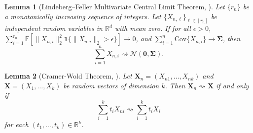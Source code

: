 \documentclass[12pt,letterpaper]{article}
\newtheorem{lemma}{Lemma}[section]
\begin{document}
\begin{lemma}[Lindeberg–Feller Multivariate Central Limit Theorem, \citep{billingsley2013convergence}]\label{lemma:Lindeberg-Feller:CLT:multivariate}
Let $\{r_n\}$ be a monotonically increasing sequence of integers. Let $\{X_{n,\ell}\}_{\ell\in[r_n]}$ be independent random variables in $\mathbb{R}^d$ with mean zero. If for all $\epsilon>0$, $\displaystyle\sum_{i=1}^{r_n}\mathbb{E}\left[\|X_{n,i}\|_2^2\mathbf{1}\{\|X_{n,i}\|_2>\epsilon\}\right]\rightarrow0$, and $\sum_{i=1}^n\mathrm{Cov}\{X_{n,i}\}\rightarrow\boldsymbol{\Sigma}$, then 
$$\sum_{i=1}^nX_{n,i}\rightsquigarrow\mathcal{N}\left(\mathbf{0},\boldsymbol{\Sigma}\right).$$
\end{lemma}

\begin{lemma}[Cramer-Wold Theorem, \citep{cramer1936some}]\label{lemma:cramer-wold} 
Let $\mathbf{X}_n=(X_{n1},\ldots,X_{nk})$ and $\mathbf{X}=(X_1,\ldots,X_k)$ be random vectors of dimension $k$. Then $\mathbf{X}_n\rightsquigarrow\mathbf{X}$ if and only if 
$$\sum_{i=1}^kt_iX_{ni}\rightsquigarrow\sum_{i=1}^kt_iX_i$$
for each $(t_1,\ldots,t_k)\in\mathbb{R}^k$. 
\end{lemma}
\end{document}
